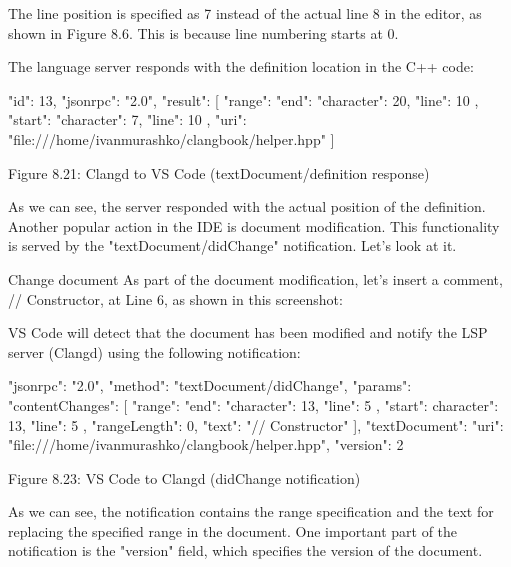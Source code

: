 The line position is specified as 7 instead of the actual line 8 in the editor, as shown in Figure 8.6. This is because line numbering starts at 0.

The language server responds with the definition location in the C++ code:

\begin{shell}
{
  "id": 13,
  "jsonrpc": "2.0",
  "result": [
  {
    "range": {
      "end": {
        "character": 20,
        "line": 10
      },
      "start": {
        "character": 7,
        "line": 10
      }
    },
    "uri": "file:///home/ivanmurashko/clangbook/helper.hpp"
  }
  ]
}
\end{shell}

\begin{center}
Figure 8.21: Clangd to VS Code (textDocument/definition response)
\end{center}

As we can see, the server responded with the actual position of the definition. Another popular action in the IDE is document modification. This functionality is served by the "textDocument/didChange" notification. Let's look at it.

Change document
As part of the document modification, let's insert a comment, // Constructor, at Line 6, as shown in this screenshot:


VS Code will detect that the document has been modified and notify the LSP server (Clangd) using the following notification:

\begin{shell}
{
  "jsonrpc": "2.0",
  "method": "textDocument/didChange",
  "params": {
    "contentChanges": [
      {
        "range": {
          "end": {
            "character": 13,
            "line": 5
          },
          "start": {
            character": 13,
            "line": 5
          }
        },
        "rangeLength": 0,
        "text": "// Constructor"
      }
    ],
    "textDocument": {
      "uri": "file:///home/ivanmurashko/clangbook/helper.hpp",
      "version": 2
    }
  }
}
\end{shell}

\begin{center}
Figure 8.23: VS Code to Clangd (didChange notification)
\end{center}

As we can see, the notification contains the range specification and the text for replacing the specified range in the document. One important part of the notification is the "version" field, which specifies the version of the document.

